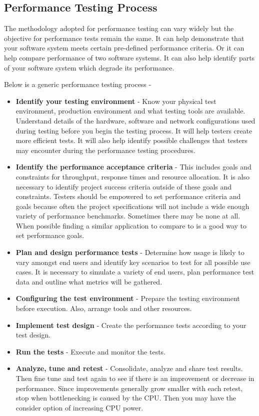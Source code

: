 \documentclass[../thesis.tex]{subfiles}
\begin{document}
	\subsection*{Performance Testing Process}
	The methodology adopted for performance testing can vary widely but the objective for performance tests remain the same. It can help demonstrate that your software system meets certain pre-defined performance criteria. Or it can help compare performance of two software systems. It can also help identify parts of your software system which degrade its performance.
	\newline
    
	Below is a generic performance testing process -

	\begin{itemize}
		\item \textbf{Identify your testing environment} - Know your physical test environment, production environment and what testing tools are available. Understand details of the hardware, software and network configurations used during testing before you begin the testing process. It will help testers create more efficient tests.  It will also help identify possible challenges that testers may encounter during the performance testing procedures.

		\item \textbf{Identify the performance acceptance criteria} - This includes goals and constraints for throughput, response times and resource allocation.  It is also necessary to identify project success criteria outside of these goals and constraints. Testers should be empowered to set performance criteria and goals because often the project specifications will not include a wide enough variety of performance benchmarks. Sometimes there may be none at all. When possible finding a similar application to compare to is a good way to set performance goals.

		\item \textbf{Plan and design performance tests} - Determine how usage is likely to vary amongst end users and identify key scenarios to test for all possible use cases. It is necessary to simulate a variety of end users, plan performance test data and outline what metrics will be gathered.

		\item \textbf{Configuring the test environment} - Prepare the testing environment before execution. Also, arrange tools and other resources.

		\item \textbf{Implement test design} - Create the performance tests according to your test design.

		\item \textbf{Run the tests} - Execute and monitor the tests.

		\item \textbf{Analyze, tune and retest} - Consolidate, analyze and share test results. Then fine tune and test again to see if there is an improvement or decrease in performance. Since improvements generally grow smaller with each retest, stop when bottlenecking is caused by the CPU. Then you may have the consider option of increasing CPU power.
	\end{itemize}
	
\end{document}
